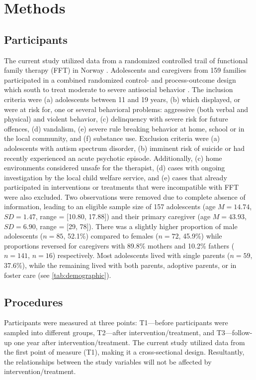 \documentclass{sn-jnl}                  %
\begin{document}
\section{Methods}

\subsection{Participants}

The current study utilized data from a randomized controlled trail of functional family therapy (FFT) in Norway \citep{bjornebekk:2013}. Adolescents and caregivers from 159 families participated in a combined randomized control- and process-outcome design which south to treat moderate to severe antisocial behavior \citep{bjornebekk:2013}. The inclusion criteria were (a) adolescents between 11 and 19 years, (b) which displayed, or were at risk for, one or several behavioral problems: aggressive (both verbal and physical) and violent behavior, (c) delinquency with severe risk for future offences, (d) vandalism, (e) severe rule breaking behavior at home, school or in the local community, and (f) substance use. Exclusion criteria were (a) adolescents with autism spectrum disorder, (b) imminent risk of suicide or had recently experienced an acute psychotic episode. Additionally, (c) home environments considered unsafe for the therapist, (d) cases with ongoing investigation by the local child welfare service, and (e) cases that already participated in interventions or treatments that were incompatible with FFT were also excluded.
Two observations were removed due to complete absence of information, leading to an eligible sample size of 157 adolescents (age $M = 14.74$, $SD = 1.47$, range = [10.80, 17.88]) and their primary caregiver (age $M = 43.93$, $SD = 6.90$, range = [29, 78]). There was a slightly higher proportion of male adolescents ($n=85$, 52.1\%) compared to females ($n=72$, 45.9\%) while proportions reversed for caregivers with 89.8\% mothers and 10.2\% fathers ($n=141$, $n=16$) respectively. Most adolescents lived with single parents ($n=59$, 37.6\%), while the remaining lived with both parents, adoptive parents, or in foster care (see \cref{tab:demographic}).

\subsection{Procedures}

Participants were measured at three points: T1---before participants were sampled into different groups, T2---after intervention/treatment, and T3---follow-up one year after intervention/treatment. The current study utilized data from the first point of measure (T1), making it a cross-sectional design. Resultantly, the relationships between the study variables will not be affected by intervention/treatment.
\end{document}
